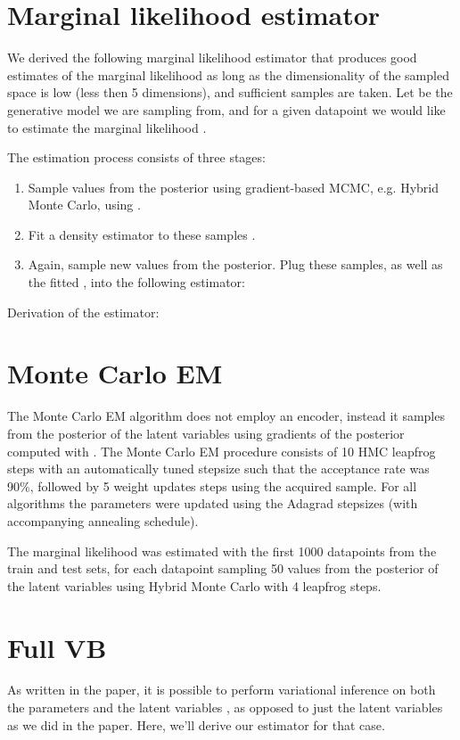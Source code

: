 \documentclass{article} \usepackage{nips13submit_e,times}
\theoremstyle{definition}
\theoremstyle{definition}
\begin{document}
\section{Marginal likelihood estimator}
We derived the following marginal likelihood estimator that produces good estimates of the marginal likelihood as long as the dimensionality of the sampled space is low (less then 5 dimensions), and sufficient samples are taken.  Let  be the generative model we are sampling from, and for a given datapoint  we would like to estimate the marginal likelihood .

The estimation process consists of three stages:
\begin{enumerate}
\item Sample  values  from the posterior using gradient-based MCMC, e.g. Hybrid Monte Carlo, using .
\item Fit a density estimator  to these samples .
\item Again, sample  new values from the posterior. Plug these samples, as well as the fitted , into the following estimator:

\end{enumerate}

Derivation of the estimator:


\section{Monte Carlo EM}
The Monte Carlo EM algorithm does not employ an encoder, instead it samples from the posterior of the latent variables using gradients of the posterior computed with . The Monte Carlo EM procedure consists of 10 HMC leapfrog steps with an automatically tuned stepsize such that the acceptance rate was 90\%, followed by 5 weight updates steps using the acquired sample. For all algorithms the parameters were updated using the Adagrad stepsizes (with accompanying annealing schedule).

The marginal likelihood was estimated with the first 1000 datapoints from the train and test sets, for each datapoint sampling 50 values from the posterior of the latent variables using Hybrid Monte Carlo with 4 leapfrog steps. 

\section{Full VB}
As written in the paper, it is possible to perform variational inference on both the parameters  and the latent variables , as opposed to just the latent variables as we did in the paper. Here, we'll derive our estimator for that case.
\end{document}
